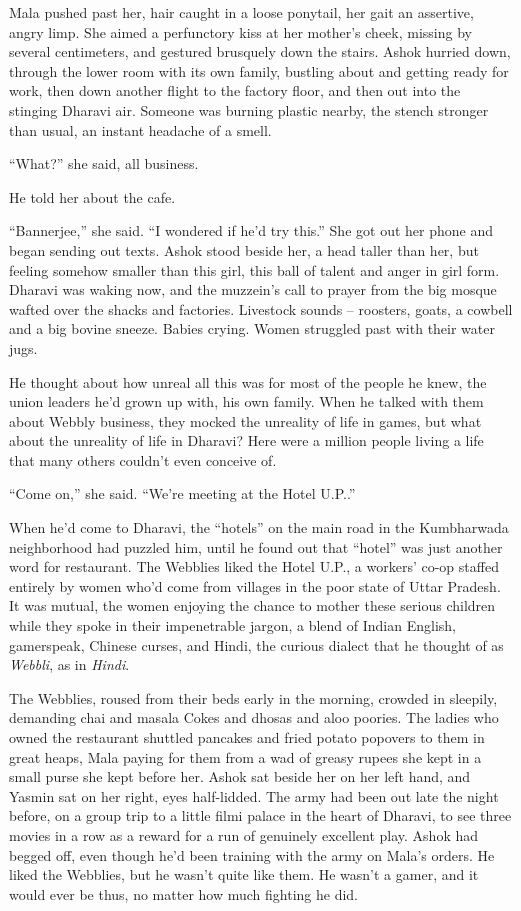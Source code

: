 Mala pushed past her, hair caught in a loose ponytail, her gait an
assertive, angry limp. She aimed a perfunctory kiss at her mother's
cheek, missing by several centimeters, and gestured brusquely down
the stairs. Ashok hurried down, through the lower room with its own
family, bustling about and getting ready for work, then down
another flight to the factory floor, and then out into the stinging
Dharavi air. Someone was burning plastic nearby, the stench
stronger than usual, an instant headache of a smell.

``What?'' she said, all business.

He told her about the cafe.

``Bannerjee,'' she said. ``I wondered if he'd try this.'' She got out
her phone and began sending out texts. Ashok stood beside her, a
head taller than her, but feeling somehow smaller than this girl,
this ball of talent and anger in girl form. Dharavi was waking now,
and the muzzein's call to prayer from the big mosque wafted over
the shacks and factories. Livestock sounds -- roosters, goats, a
cowbell and a big bovine sneeze. Babies crying. Women struggled
past with their water jugs.

He thought about how unreal all this was for most of the people he
knew, the union leaders he'd grown up with, his own family. When he
talked with them about Webbly business, they mocked the unreality
of life in games, but what about the unreality of life in Dharavi?
Here were a million people living a life that many others couldn't
even conceive of.

``Come on,'' she said. ``We're meeting at the Hotel U.P..''

When he'd come to Dharavi, the ``hotels'' on the main road in the
Kumbharwada neighborhood had puzzled him, until he found out that
``hotel'' was just another word for restaurant. The Webblies liked
the Hotel U.P., a workers' co-op staffed entirely by women who'd
come from villages in the poor state of Uttar Pradesh. It was
mutual, the women enjoying the chance to mother these serious
children while they spoke in their impenetrable jargon, a blend of
Indian English, gamerspeak, Chinese curses, and Hindi, the curious
dialect that he thought of as \emph{Webbli}, as in \emph{Hindi}.

The Webblies, roused from their beds early in the morning, crowded
in sleepily, demanding chai and masala Cokes and dhosas and aloo
poories. The ladies who owned the restaurant shuttled pancakes and
fried potato popovers to them in great heaps, Mala paying for them
from a wad of greasy rupees she kept in a small purse she kept
before her. Ashok sat beside her on her left hand, and Yasmin sat
on her right, eyes half-lidded. The army had been out late the
night before, on a group trip to a little filmi palace in the heart
of Dharavi, to see three movies in a row as a reward for a run of
genuinely excellent play. Ashok had begged off, even though he'd
been training with the army on Mala's orders. He liked the
Webblies, but he wasn't quite like them. He wasn't a gamer, and it
would ever be thus, no matter how much fighting he did.

